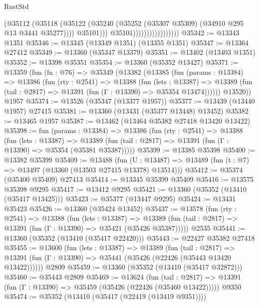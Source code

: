 \begin{lexlean}{RustStd}
\begin{coremodule}
                                        (@35112
                                          (@35118
                                            (@35122
                                              (@35240
                                                (@35252
                                                  (@35307 @35309)
                                                  (@34910 @295 @13 @3441 @35277))))
                                            @35101)))
                                      @35101)))))))))))))))))
@35342 := @13343 @1351
@35346 := @13345 (@13349 @1351) (@13355 @1351)
@35347 := @13364 @27412
@35349 := @13360 (@35347 @13379)
@35351 := @13402 (@13403 @1351)
@35352 := @13398 @35351
@35354 := @13360 (@35352 @13427)
@35371 := @13359
    (fun (fn : @76) =>
    @35349
      (@13382
        (@13385
          (fun (params : @13384) =>
          @13386
            (fun (rty : @2541) =>
            @13388
              (fun (lets : @13387) =>
              @13389 (fun (tail : @2817) => @13391 (fun (Γ : @13390) => @35354 @13474))))))
        @13520))
    @1957
@35374 := @13526 (@35347 (@13377 @1957))
@35377 := @13439 (@13440 @1957) @27415
@35381 := @13360 (@13431 (@35377 @13448) @13452)
@35382 := @13465 @1957
@35387 := @13462 (@13464 @35382 @27418 @13420 @13422)
@35398 := fun (params : @13384) =>
  @13386
    (fun (rty : @2541) =>
    @13388
      (fun (lets : @13387) =>
      @13389 (fun (tail : @2817) => @13391 (fun (Γ : @13390) => @35354 (@35381 @35387)))))
@35399 := @13385 @35398
@35400 := @13382 @35399
@35409 := @13488
    (fun (U : @13487) => @13489 (fun (t : @7) => @13497 (@13360 (@13503 @27415 @13378) @13514)))
@35412 := @35374 (@35400 @35409) @27413
@35414 := @13345 @35399 @35409
@35416 := @13575 @35398 @9295
@35417 := @13412 @9295
@35421 := @13360 (@35352 (@13410 (@35417 @13425)))
@35423 := @35377 (@13447 @9295)
@35424 := @13431 @35423
@35426 := @13360 (@35424 @13452)
@35437 := @13578
    (fun (rty : @2541) =>
    @13388
      (fun (lets : @13387) =>
      @13389 (fun (tail : @2817) => @13391 (fun (Γ : @13390) => @35421 (@35426 @35387)))))
    @2535
@35441 := @13360 (@35352 (@13410 (@35417 @22420)))
@35443 := @22427 @35382 @27418
@35455 := @13600
    (fun (lets : @13387) =>
    @13389
      (fun (tail : @2817) =>
      @13391 (fun (Γ : @13390) => @35441 (@35426 (@22426 (@35443 @13420 @13422))))))
    @2809
@35459 := @13360 (@35352 (@13410 (@35417 @32872)))
@35460 := @35443 @2809
@35469 := @13624
    (fun (tail : @2817) => @13391 (fun (Γ : @13390) => @35459 (@35426 (@22426 (@35460 @13422)))))
    @9350
@35474 := @35352 (@13410 (@35417 (@22419 (@13419 @9351))))

\end{coremodule}
\end{lexlean}
